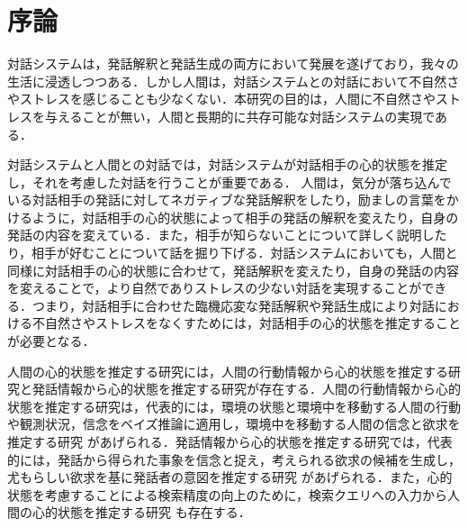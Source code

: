 \chapter{序論}

\par
対話システムは，発話解釈と発話生成の両方において発展を遂げており，我々の生活に浸透しつつある．しかし人間は，対話システムとの対話において不自然さやストレスを感じることも少なくない．本研究の目的は，人間に不自然さやストレスを与えることが無い，人間と長期的に共存可能な対話システムの実現である．

\par
対話システムと人間との対話では，対話システムが対話相手の心的状態を推定し，それを考慮した対話を行うことが重要である．
人間は，気分が落ち込んでいる対話相手の発話に対してネガティブな発話解釈をしたり，励ましの言葉をかけるように，対話相手の心的状態によって相手の発話の解釈を変えたり，自身の発話の内容を変えている．また，相手が知らないことについて詳しく説明したり，相手が好むことについて話を掘り下げる．対話システムにおいても，人間と同様に対話相手の心的状態に合わせて，発話解釈を変えたり，自身の発話の内容を変えることで，より自然でありストレスの少ない対話を実現することができる．つまり，対話相手に合わせた臨機応変な発話解釈や発話生成により対話における不自然さやストレスをなくすためには，対話相手の心的状態を推定することが必要となる．


\par
人間の心的状態を推定する研究には，人間の行動情報から心的状態を推定する研究と発話情報から心的状態を推定する研究が存在する．人間の行動情報から心的状態を推定する研究は，代表的には，環境の状態と環境中を移動する人間の行動や観測状況，信念をベイズ推論に適用し，環境中を移動する人間の信念と欲求を推定する研究 \cite{baker2011bayesian}があげられる．発話情報から心的状態を推定する研究では，代表的には，発話から得られた事象を信念と捉え，考えられる欲求の候補を生成し，尤もらしい欲求を基に発話者の意図を推定する研究 \cite{高橋拓誠2015bdi}があげられる．また，心的状態を考慮することによる検索精度の向上のために，検索クエリへの入力から人間の心的状態を推定する研究 \cite{10.1007/978-3-642-02481-8_4}も存在する．

